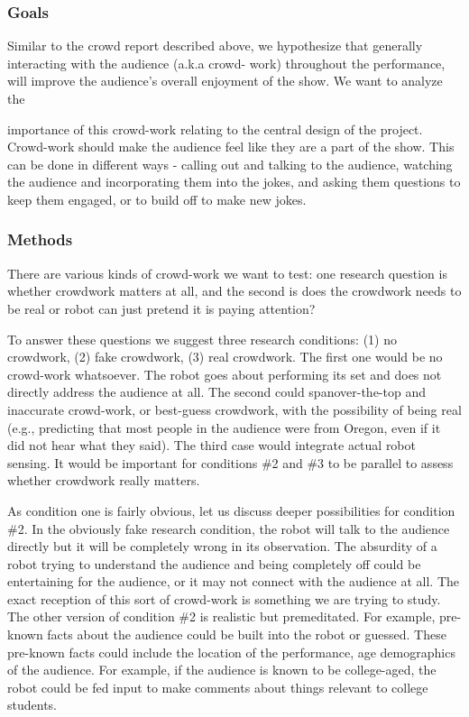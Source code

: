 \subsubsection{Goals}

Similar to the crowd report described above, we hypothesize that generally interacting with the audience (a.k.a crowd-
work) throughout the performance, will improve the audience’s overall enjoyment of the show. We want to analyze the

importance of this crowd-work relating to the central design of the project. Crowd-work should make the audience feel
like they are a part of the show. This can be done in different ways - calling out and talking to the audience, watching
the audience and incorporating them into the jokes, and asking them questions to keep them engaged, or to build off to
make new jokes.

\subsubsection{Methods}
There are various kinds of crowd-work we want to test: one research question is whether crowdwork matters at all, and
the second is does the crowdwork needs to be real or robot can just pretend it is paying attention?

To answer these questions we suggest three research conditions: (1) no crowdwork, (2) fake crowdwork, (3) real
crowdwork. The first one would be no crowd-work whatsoever. The robot goes about performing its set and does
not directly address the audience at all. The second could spanover-the-top and inaccurate crowd-work, or best-guess
crowdwork, with the possibility of being real (e.g., predicting that most people in the audience were from Oregon, even
if it did not hear what they said). The third case would integrate actual robot sensing. It would be important for
conditions \#2 and \#3 to be parallel to assess whether crowdwork really matters.

As condition one is fairly obvious, let us discuss deeper possibilities for condition \#2. In the obviously fake research
condition, the robot will talk to the audience directly but it will be completely wrong in its observation. The absurdity
of a robot trying to understand the audience and being completely off could be entertaining for the audience, or it may
not connect with the audience at all. The exact reception of this sort of crowd-work is something we are trying to study.
The other version of condition \#2 is realistic but premeditated. For example, pre-known facts about the audience
could be built into the robot or guessed. These pre-known facts could include the location of the performance, age
demographics of the audience. For example, if the audience is known to be college-aged, the robot could be fed input
to make comments about things relevant to college students.

